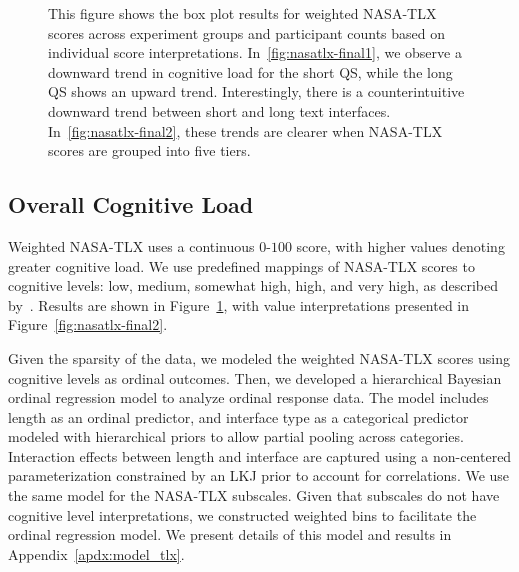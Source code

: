 \begin{figure}[htbp]
    \caption{This figure shows the box plot results for weighted NASA-TLX scores across experiment groups and participant counts based on individual score interpretations. In~\ref{fig:nasatlx-final1}, we observe a downward trend in cognitive load for the short QS, while the long QS shows an upward trend. Interestingly, there is a counterintuitive downward trend between short and long text interfaces. In~\ref{fig:nasatlx-final2}, these trends are clearer when NASA-TLX scores are grouped into five tiers.}
    \label{fig:nasatlx-final}
\end{figure}

\subsection{Overall Cognitive Load}
\label{sec:cog_overall}
Weighted NASA-TLX uses a continuous $0$-$100$ score, with higher values denoting greater cognitive load. We use predefined mappings of NASA-TLX scores to cognitive levels: low, medium, somewhat high, high, and very high, as described by~\textcite{hart1988development}. Results are shown in Figure~\ref{fig:nasatlx-final}, with value interpretations presented in Figure~\ref{fig:nasatlx-final2}.

Given the sparsity of the data, we modeled the weighted NASA-TLX scores using cognitive levels as ordinal outcomes. Then, we developed a hierarchical Bayesian ordinal regression model to analyze ordinal response data. The model includes length as an ordinal predictor, and interface type as a categorical predictor modeled with hierarchical priors to allow partial pooling across categories. Interaction effects between length and interface are captured using a non-centered parameterization constrained by an LKJ prior to account for correlations. We use the same model for the NASA-TLX subscales. Given that subscales do not have cognitive level interpretations, we constructed weighted bins to facilitate the ordinal regression model. We present details of this model and results in Appendix~\ref{apdx:model_tlx}.

